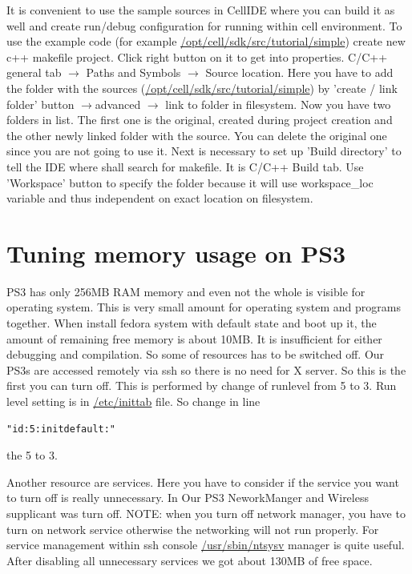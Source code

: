 It is convenient to use the sample sources in CellIDE where you can build it as well and create run/debug configuration for running within cell environment.
To use the example code (for example \url{/opt/cell/sdk/src/tutorial/simple}) create new c++ makefile project.
Click right button on it to get into properties.
C/C++ general tab $\rightarrow$ Paths and Symbols $\rightarrow$ Source location.
Here you have to add the folder with the sources (\url{/opt/cell/sdk/src/tutorial/simple}) by 'create / link folder' button $\rightarrow$advanced $\rightarrow$ link to folder in filesystem.
Now you have two folders in list. The first one is the original, created during project creation and the other newly linked folder with the source.
You can delete the original one since you are not going to use it.
Next is necessary to set up 'Build directory' to tell the IDE where shall search for makefile.
It is C/C++ Build tab. Use 'Workspace' button to specify the folder because it will use workspace\_loc variable and thus independent on exact location on filesystem.

\section{Tuning memory usage on PS3}
\label{ps3MemoryUsage}

PS3 has only 256MB RAM memory and even not the whole is visible for operating system.
This is very small amount for operating system and programs together.
When install fedora system with default state and boot up it, the amount of remaining free memory is about 10MB.
It is insufficient for either debugging and compilation.
So some of resources has to be switched off.
Our PS3s are accessed remotely via ssh so there is no need for X server.
So this is the first you can turn off. This is performed by change of runlevel from 5 to 3.
Run level setting is in \url{/etc/inittab} file. So change in line
\begin{verbatim}
"id:5:initdefault:"
\end{verbatim}
the 5 to 3.

\par
Another resource are services.
Here you have to consider if the service you want to turn off is really unnecessary.
In Our PS3 NeworkManger and Wireless supplicant was turn off.
NOTE: when you turn off network manager, you have to turn on network service otherwise the networking will not run properly.
For service management within ssh console \url{/usr/sbin/ntsysv} manager is quite useful.
After disabling all unnecessary services we got about 130MB of free space.

